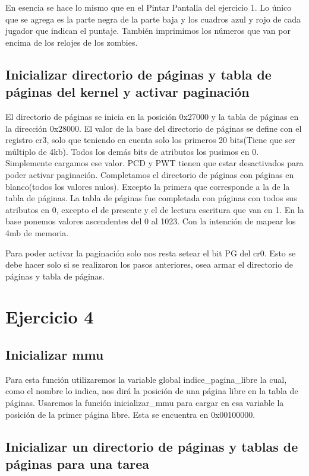 \documentclass[a4paper]{article}
\begin{document}
En esencia se hace lo mismo que en el Pintar Pantalla del ejercicio 1. Lo único que se agrega es la parte negra de la parte baja y los cuadros azul y rojo de cada jugador que indican el puntaje. También imprimimos los números que van por encima de los relojes de los zombies.

\subsection{Inicializar directorio de páginas y tabla de páginas del kernel y activar paginación}

El directorio de páginas se inicia en la posición 0x27000 y la tabla de páginas en la dirección 0x28000. El valor de la base del directorio de páginas se define con el registro cr3, solo que teniendo en cuenta solo los primeros 20 bits(Tiene que ser múltiplo de 4kb). Todos los demás bits de atributos los pusimos en 0. Simplemente cargamos ese valor. PCD y PWT tienen que estar desactivados para poder activar paginación. Completamos el directorio de páginas con páginas en blanco(todos los valores nulos). Excepto la primera que corresponde a la de la tabla de páginas. La tabla de páginas fue completada con páginas con todos sus atributos en 0, excepto el de presente y el de lectura escritura que van en 1. En la base ponemos valores ascendentes del 0 al 1023. Con la intención de mapear los 4mb de memoria.

Para poder activar la paginación solo nos resta setear el bit PG del cr0. Esto se debe hacer solo si se realizaron los pasos anteriores, osea armar el directorio de páginas y tabla de páginas.

\section{Ejercicio 4}

\subsection{Inicializar mmu}

Para esta función utilizaremos la variable global indice\_pagina\_libre la cual, como el nombre lo indica, nos dirá la posición de una página libre en la tabla de páginas. Usaremos la función inicializar\_mmu para cargar en esa variable la posición de la primer página libre. Esta se encuentra en 0x00100000. 

\subsection{Inicializar un directorio de páginas y tablas de páginas para una tarea}
\end{document}
